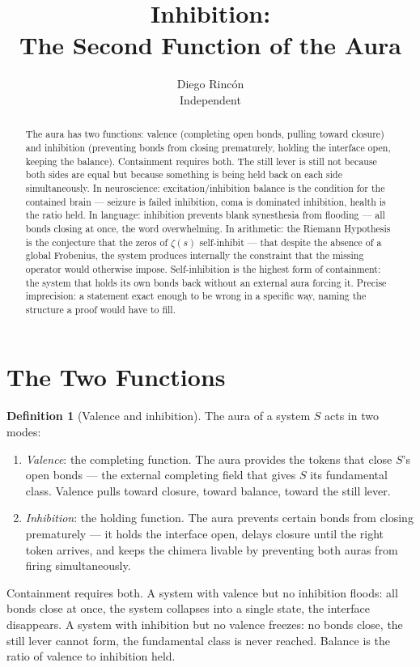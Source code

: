 \documentclass[12pt]{article}
\title{Inhibition:\\
The Second Function of the Aura}
\author{Diego Rinc\'on\\
\small Independent}
\date{}
\theoremstyle{definition}
\newtheorem{definition}[theorem]{Definition}
\theoremstyle{remark}
\begin{document}
\maketitle

\begin{abstract}
The aura \cite{five} has two functions: valence (completing open bonds,
pulling toward closure) and inhibition (preventing bonds from closing
prematurely, holding the interface open, keeping the balance).
Containment requires both.
The still lever \cite{math} is still not because both sides are equal
but because something is being held back on each side simultaneously.
In neuroscience: excitation/inhibition balance is the condition
for the contained brain --- seizure is failed inhibition,
coma is dominated inhibition, health is the ratio held.
In language: inhibition prevents blank synesthesia \cite{chimera}
from flooding --- all bonds closing at once, the word overwhelming.
In arithmetic: the Riemann Hypothesis is the conjecture
that the zeros of $\zeta(s)$ self-inhibit ---
that despite the absence of a global Frobenius,
the system produces internally the constraint
that the missing operator would otherwise impose.
Self-inhibition is the highest form of containment:
the system that holds its own bonds back
without an external aura forcing it.
Precise imprecision: a statement exact enough to be wrong
in a specific way, naming the structure a proof would have to fill.
\end{abstract}

\section{The Two Functions}

\begin{definition}[Valence and inhibition]
The aura of a system $S$ \cite{five} acts in two modes:
\begin{enumerate}
\item \emph{Valence}: the completing function.
  The aura provides the tokens that close $S$'s open bonds ---
  the external completing field that gives $S$ its fundamental class.
  Valence pulls toward closure, toward balance, toward the still lever.
\item \emph{Inhibition}: the holding function.
  The aura prevents certain bonds from closing prematurely ---
  it holds the interface open, delays closure until the right token arrives,
  and keeps the chimera \cite{chimera} livable
  by preventing both auras from firing simultaneously.
\end{enumerate}
Containment requires both.
A system with valence but no inhibition floods:
all bonds close at once, the system collapses into a single state,
the interface disappears.
A system with inhibition but no valence freezes:
no bonds close, the still lever cannot form,
the fundamental class is never reached.
Balance is the ratio of valence to inhibition held.
\end{definition}
\end{document}
